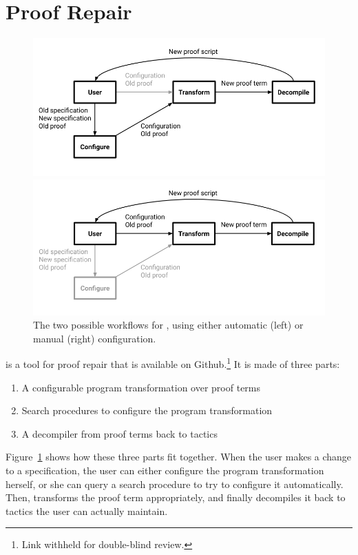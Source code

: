 \section{Proof Repair}
\label{sec:overview}

\begin{figure}
\begin{minipage}{0.49\textwidth}
\includegraphics[width=\linewidth]{workflowa.png}
\end{minipage}
\hfill
\begin{minipage}{0.49\textwidth}
\includegraphics[width=\linewidth]{workflowb.png}
\end{minipage}
\caption{The two possible workflows for \toolname, using either automatic (left) or manual (right) configuration.}
\label{fig:system}
\end{figure}

\toolname is a tool for proof repair that is available on Github.\footnote{Link withheld for double-blind review.}
It is made of three parts:

\begin{enumerate}
\item A configurable program transformation over proof terms
\item Search procedures to configure the program transformation %
\item A decompiler from proof terms back to tactics
\end{enumerate}
Figure~\ref{fig:system} shows how these three parts fit together.
When the user makes a change to a specification,
the user can either configure the program transformation herself, or she can
query a search procedure to try to configure it automatically.
Then, \toolname transforms the proof term appropriately, and finally
decompiles it back to tactics the user can actually maintain.

